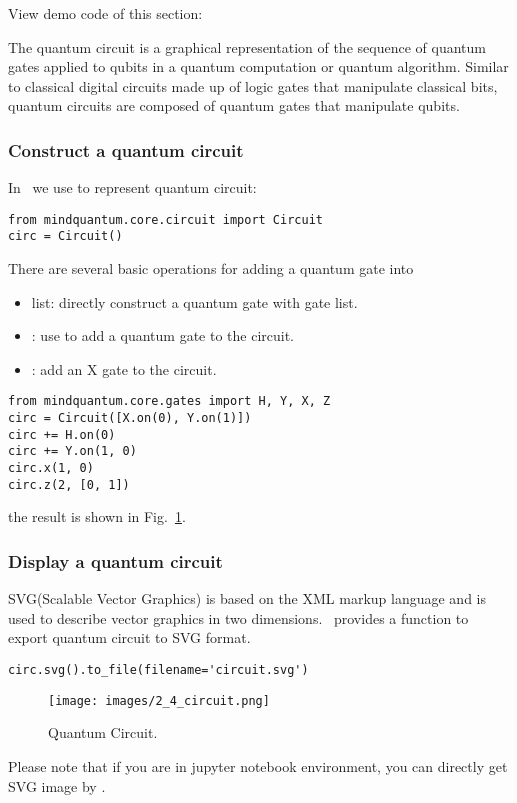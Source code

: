 View demo code of this section: 

The quantum circuit is a graphical representation of the sequence of quantum gates applied to qubits in a quantum computation or quantum algorithm. Similar to classical digital circuits made up of logic gates that manipulate classical bits, quantum circuits are composed of quantum gates that manipulate qubits.

\subsubsection{Construct a quantum circuit}
In \MindQuantum\ we use \Circuit to represent quantum circuit:

\begin{lstlisting}
from mindquantum.core.circuit import Circuit
circ = Circuit()
\end{lstlisting}

There are several basic operations for adding a quantum gate into \Circuit
\begin{itemize}
    \item list: directly construct a quantum gate with gate list.
    \item \code{+=}: use \code{+=} to add a quantum gate to the circuit.
    \item {}: add an X gate to the circuit.
\end{itemize}
\begin{lstlisting}
from mindquantum.core.gates import H, Y, X, Z
circ = Circuit([X.on(0), Y.on(1)])
circ += H.on(0)
circ += Y.on(1, 0)
circ.x(1, 0)
circ.z(2, [0, 1])
\end{lstlisting}

the result is shown in Fig.~\ref{fig:Quantum-Circuit}.

\subsubsection{Display a quantum circuit}
SVG(Scalable Vector Graphics) is based on the XML markup language and is used to describe vector graphics in two dimensions. \MindQuantum\ provides a function to export quantum circuit to SVG format.
\begin{lstlisting}
circ.svg().to_file(filename='circuit.svg')
\end{lstlisting}
\begin{figure}[h]
    \begin{center}
        \texttt{[image: images/2\_4\_circuit.png]}
    \end{center}
    \caption{Quantum Circuit.}
    \label{fig:Quantum-Circuit}
\end{figure}
Please note that if you are in jupyter notebook environment, you can directly get SVG image by .


